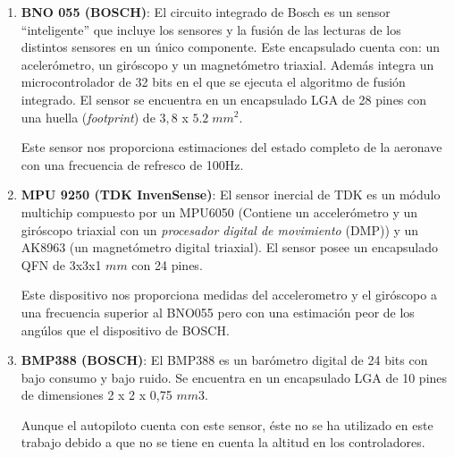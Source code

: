 \begin{enumerate}
	\item \textbf{BNO 055 (BOSCH)}: El circuito integrado de Bosch es un sensor ``inteligente'' que incluye los sensores y la fusión de las lecturas de los distintos sensores en un único componente. Este encapsulado cuenta con: un acelerómetro, un giróscopo y un magnetómetro triaxial. Además integra un microcontrolador de 32 bits en el que se ejecuta el algoritmo de fusión integrado. El sensor se encuentra en un encapsulado LGA de 28 pines con una huella (\textit{footprint}) de $3,8$ x $5.2\; mm^2$.
	
	Este sensor nos proporciona estimaciones del estado completo de la aeronave con una frecuencia de refresco de 100Hz. 
	
	\item \textbf{MPU 9250 (TDK InvenSense)}: El sensor inercial de TDK es un módulo multichip compuesto por un MPU6050 (Contiene un accelerómetro y un giróscopo triaxial con un \textit{procesador digital de movimiento} (DMP)) y un  AK8963 (un magnetómetro digital triaxial). El sensor posee un encapsulado QFN de 3x3x1 $mm$ con 24 pines.
	
	Este dispositivo nos proporciona medidas del accelerometro y el giróscopo a una frecuencia superior al BNO055 pero con una estimación peor de los angúlos que el dispositivo de BOSCH.
	
	\item \textbf{BMP388 (BOSCH)}: El BMP388 es un barómetro digital de 24 bits con bajo consumo y bajo ruido. Se encuentra en un encapsulado LGA de 10 pines de dimensiones 2 x 2 x 0,75 $mm3$.
	
	Aunque el autopiloto cuenta con este sensor, éste no se ha utilizado en este trabajo debido a que no se tiene en cuenta la altitud en los controladores.
	
\end{enumerate}

